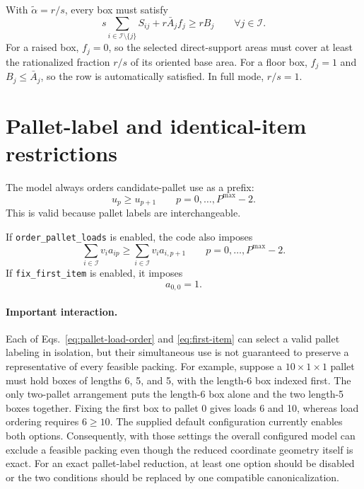 \documentclass[11pt]{article}
\newcommand{\Items}{\mathcal I}
\begin{document}
With $\widetilde\alpha=r/s$, every box must satisfy
\begin{equation}
 s\sum_{i\in\Items\setminus\{j\}}S_{ij}
 +r\bar A_jf_j
 \ge rB_j
 \qquad\forall j\in\Items.
 \label{eq:fractional-support}
\end{equation}
For a raised box, $f_j=0$, so the selected direct-support areas must cover at
least the rationalized fraction $r/s$ of its oriented base area.  For a floor
box, $f_j=1$ and $B_j\le\bar A_j$, so the row is automatically satisfied.  In
full mode, $r/s=1$.

\section{Pallet-label and identical-item restrictions}
\label{sec:symmetry}

The model always orders candidate-pallet use as a prefix:
\begin{equation}
 u_p\ge u_{p+1}
 \qquad p=0,\ldots,P^{\max}-2.
 \label{eq:pallet-prefix}
\end{equation}
This is valid because pallet labels are interchangeable.

If \texttt{order\_pallet\_loads} is enabled, the code also imposes
\begin{equation}
 \sum_{i\in\Items}v_i a_{ip}
 \ge\sum_{i\in\Items}v_i a_{i,p+1}
 \qquad p=0,\ldots,P^{\max}-2.
 \label{eq:pallet-load-order}
\end{equation}
If \texttt{fix\_first\_item} is enabled, it imposes
\begin{equation}
 a_{0,0}=1.
 \label{eq:first-item}
\end{equation}

\paragraph{Important interaction.}
Each of Eqs.~\eqref{eq:pallet-load-order} and \eqref{eq:first-item} can select a
valid pallet labeling in isolation, but their simultaneous use is not
guaranteed to preserve a representative of every feasible packing.  For
example, suppose a $10\times1\times1$ pallet must hold boxes of lengths 6, 5,
and 5, with the length-6 box indexed first.  The only two-pallet arrangement
puts the length-6 box alone and the two length-5 boxes together.  Fixing the
first box to pallet 0 gives loads 6 and 10, whereas load ordering requires
$6\ge10$.  The supplied default configuration currently enables both options.
Consequently, with those settings the overall configured model can exclude a
feasible packing even though the reduced coordinate geometry itself is exact.
For an exact pallet-label reduction, at least one option should be disabled or
the two conditions should be replaced by one compatible canonicalization.
\end{document}
